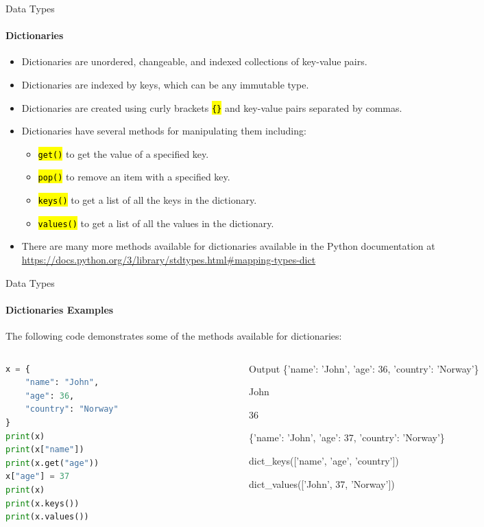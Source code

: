 \documentclass[
    aspectratio=169, 
    usepdftitle=false, 
    xcolor={dvipsnames},
    hyperref={
        colorlinks,
        linkcolor=black,
        urlcolor=blue}
    ]{beamer}
\let\OldTexttt\texttt
\renewcommand{\texttt}[1]{\OldTexttt{\hl{#1}}}%
\begin{document}
\begin{frame}[fragile]{Data Types}
    \framesubtitle{Dictionaries}
    \begin{itemize}
        \item Dictionaries are unordered, changeable, and indexed collections of key-value pairs.
        \item Dictionaries are indexed by keys, which can be any immutable type.
        \item Dictionaries are created using curly brackets \texttt{\{\}} and key-value pairs separated by commas.
        \item Dictionaries have several methods for manipulating them including:
              \begin{itemize}
                  \item \texttt{get()} to get the value of a specified key.
                  \item \texttt{pop()} to remove an item with a specified key.
                  \item \texttt{keys()} to get a list of all the keys in the dictionary.
                  \item \texttt{values()} to get a list of all the values in the dictionary.
              \end{itemize}
        \item There are many more methods available for dictionaries available in the Python documentation at \url{https://docs.python.org/3/library/stdtypes.html#mapping-types-dict}
    \end{itemize}
\end{frame}
\begin{frame}[fragile]{Data Types}
    \framesubtitle{Dictionaries Examples}
    The following code demonstrates some of the methods available for dictionaries:

    \begin{columns}
        \begin{column}{0.3\textwidth}
            \begin{lstlisting}[language=Python]
x = {
    "name": "John",
    "age": 36,
    "country": "Norway"
}
print(x)
print(x["name"])
print(x.get("age"))
x["age"] = 37
print(x)
print(x.keys())
print(x.values())
    \end{lstlisting}
        \end{column}
        \begin{column}{0.6\textwidth}
            \begin{block}{Output}
\{'name': 'John', 'age': 36, 'country': 'Norway'\}

John

36

\{'name': 'John', 'age': 37, 'country': 'Norway'\}

dict\_keys(['name', 'age', 'country'])

dict\_values(['John', 37, 'Norway'])
            \end{block}                    
        \end{column}
    \end{columns}
\end{frame}
\end{document}
